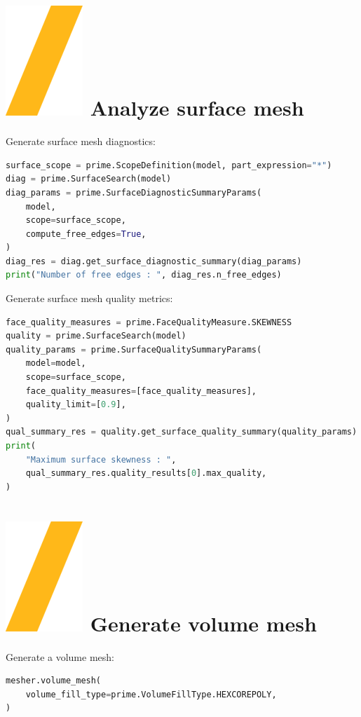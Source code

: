 \documentclass[9pt,landscape]{article}
\begin{document}
\begin{multicols}{3}
\section{\includegraphics[height=\fontcharht\font`\S]{slash.png} Analyze surface mesh}
Generate surface mesh diagnostics: 
\begin{lstlisting}[language=Python]
surface_scope = prime.ScopeDefinition(model, part_expression="*")
diag = prime.SurfaceSearch(model)
diag_params = prime.SurfaceDiagnosticSummaryParams(
    model,
    scope=surface_scope,
    compute_free_edges=True,
)
diag_res = diag.get_surface_diagnostic_summary(diag_params)
print("Number of free edges : ", diag_res.n_free_edges)
\end{lstlisting}

Generate surface mesh quality metrics:
\begin{lstlisting}[language=Python]
face_quality_measures = prime.FaceQualityMeasure.SKEWNESS
quality = prime.SurfaceSearch(model)
quality_params = prime.SurfaceQualitySummaryParams(
    model=model,
    scope=surface_scope,
    face_quality_measures=[face_quality_measures],
    quality_limit=[0.9],
)
qual_summary_res = quality.get_surface_quality_summary(quality_params)
print(
    "Maximum surface skewness : ",
    qual_summary_res.quality_results[0].max_quality,
)
\end{lstlisting}

\section{\includegraphics[height=\fontcharht\font`\S]{slash.png} Generate volume mesh}
Generate a volume mesh:
\begin{lstlisting}[language=Python]
mesher.volume_mesh(
    volume_fill_type=prime.VolumeFillType.HEXCOREPOLY,
)
\end{lstlisting}


\end{multicols}
\end{document}
